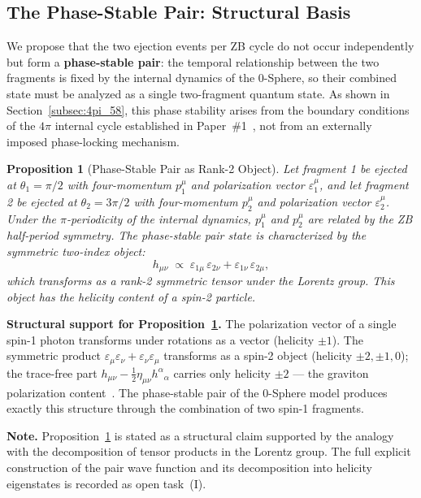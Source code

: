 \documentclass[%
 reprint, amsmath,amssymb, aps, prb, ]{revtex4-2}
\numberwithin{equation}{section}
\newtheorem{proposition}[theorem]{Proposition}
\newcommand{\iphase}{\theta}
\begin{document}
\subsection{The Phase-Stable Pair: Structural Basis}

We propose that the two ejection events per ZB cycle do not occur independently but form a \textbf{phase-stable pair}: the temporal relationship between the two fragments is fixed by the internal dynamics of the 0-Sphere, so their combined state must be analyzed as a single two-fragment quantum state.
As shown in Section~\ref{subsec:4pi_58}, this phase stability arises from the boundary conditions of the $4\pi$ internal cycle established in Paper~\#1~\cite{hanamura01}, not from an externally imposed phase-locking mechanism.

\begin{proposition}[Phase-Stable Pair as Rank-2 Object]
\label{prop:rank2}
Let fragment 1 be ejected at $\iphase_1 = \pi/2$ with four-momentum $p_1^\mu$ and polarization vector $\varepsilon_1^\mu$, and let fragment 2 be ejected at $\iphase_2 = 3\pi/2$ with four-momentum $p_2^\mu$ and polarization vector $\varepsilon_2^\mu$.
Under the $\pi$-periodicity of the internal dynamics, $p_1^\mu$ and $p_2^\mu$ are related by the ZB half-period symmetry.
The phase-stable pair state is characterized by the symmetric two-index object:
\begin{equation}
h_{\mu\nu} \;\propto\; \varepsilon_{1\mu}\,\varepsilon_{2\nu} + \varepsilon_{1\nu}\,\varepsilon_{2\mu},
\label{eq:rank2_tensor}
\end{equation}
which transforms as a rank-2 symmetric tensor under the Lorentz group.
This object has the helicity content of a spin-2 particle.
\end{proposition}

\noindent\textbf{Structural support for Proposition~\ref{prop:rank2}.}
The polarization vector of a single spin-1 photon transforms under rotations as a vector (helicity $\pm 1$).
The symmetric product $\varepsilon_\mu\varepsilon_\nu + \varepsilon_\nu\varepsilon_\mu$ transforms as a spin-2 object (helicity $\pm 2, \pm 1, 0$); the trace-free part $h_{\mu\nu} - \frac{1}{2}\eta_{\mu\nu} h^\alpha{}_\alpha$ carries only helicity $\pm 2$ --- the graviton polarization content~\cite{Wigner1939,FierzPauli1939,Weinberg1995}.
The phase-stable pair of the 0-Sphere model produces exactly this structure through the combination of two spin-1 fragments.

\textbf{Note.}
Proposition~\ref{prop:rank2} is stated as a structural claim supported by the analogy with the decomposition of tensor products in the Lorentz group.
The full explicit construction of the pair wave function and its decomposition into helicity eigenstates is recorded as open task~(I).
\end{document}
